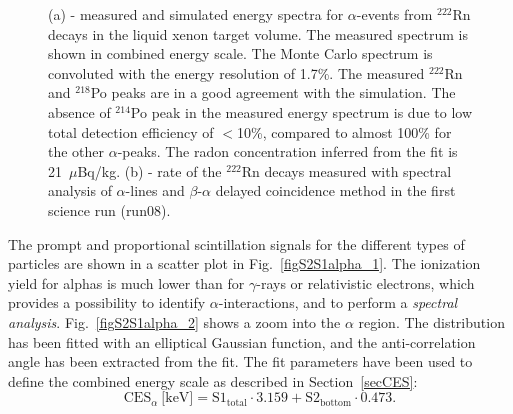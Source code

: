 \begin{figure}[!b]
\centering
{}
\caption[Measured and simulated energy spectra for $\alpha$-events from $^{222}$Rn decays in the liquid xenon target volume, and comparison of the radon concentration measured with both methods]{(a) - measured and simulated energy spectra for $\alpha$-events from $^{222}$Rn decays in the liquid xenon target volume. The measured spectrum is shown in combined energy scale. The Monte Carlo spectrum is convoluted with the energy resolution of 1.7\%. The measured $^{222}$Rn and $^{218}$Po peaks are in a good agreement with the simulation. The absence of $^{214}$Po peak in the measured energy spectrum is due to low total detection efficiency of $<$10\%, compared to almost 100\% for the other $\alpha$-peaks. The radon concentration inferred from the fit is 21~$\mu$Bq/kg. (b) - rate of the $^{222}$Rn decays measured with spectral analysis of $\alpha$-lines and $\beta$-$\alpha$ delayed coincidence method in the first science run (run08).}
\label{figCESalpha}
\end{figure}

The prompt and proportional scintillation signals for the different types of particles are shown in a scatter plot in Fig.~\ref{figS2S1alpha_1}. The ionization yield for alphas is much lower than for $\gamma$-rays or relativistic electrons, which  provides a possibility to identify $\alpha$-interactions, and to perform a {\it spectral analysis}.
Fig.~\ref{figS2S1alpha_2} shows a zoom into the $\alpha$ region. The distribution has been fitted with an elliptical Gaussian function, and the anti-correlation angle has been extracted from the fit. The fit  parameters have been used to define the combined energy scale as described in Section~\ref{secCES}:
\begin{equation}
\mathrm{CES}_{\alpha}\ \text{[keV]} = \mathrm{S}1_{\mathrm{total}} \cdot 3.159 + \mathrm{S}2_{\mathrm{bottom}} \cdot 0.473.
\end{equation}

